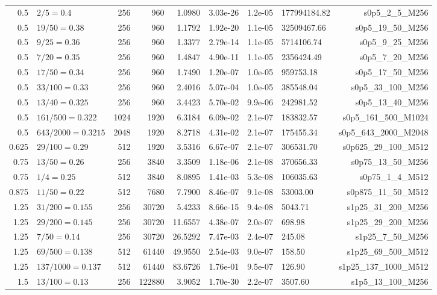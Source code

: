 \begin{center}
\begin{longtable}{@{}rlrrrlllr@{}}
0.5 & $2/5=0.4$ & 256 & 960 & 1.0980 & 3.03e-26 & 1.2e-05 & 177994184.82 & s0p5\_2\_5\_M256\\
0.5 & $19/50=0.38$ & 256 & 960 & 1.1792 & 1.92e-20 & 1.1e-05 & 32509467.66 & s0p5\_19\_50\_M256\\
0.5 & $9/25=0.36$ & 256 & 960 & 1.3377 & 2.79e-14 & 1.1e-05 & 5714106.74 & s0p5\_9\_25\_M256\\
0.5 & $7/20=0.35$ & 256 & 960 & 1.4847 & 4.90e-11 & 1.1e-05 & 2356424.49 & s0p5\_7\_20\_M256\\
0.5 & $17/50=0.34$ & 256 & 960 & 1.7490 & 1.20e-07 & 1.0e-05 & 959753.18 & s0p5\_17\_50\_M256\\
0.5 & $33/100=0.33$ & 256 & 960 & 2.4016 & 5.07e-04 & 1.0e-05 & 385548.04 & s0p5\_33\_100\_M256\\
0.5 & $13/40=0.325$ & 256 & 960 & 3.4423 & 5.70e-02 & 9.9e-06 & 242981.52 & s0p5\_13\_40\_M256\\
0.5 & $161/500=0.322$ & 1024 & 1920 & 6.3184 & 6.09e-02 & 2.1e-07 & 183832.57 & s0p5\_161\_500\_M1024\\
0.5 & $643/2000=0.3215$ & 2048 & 1920 & 8.2718 & 4.31e-02 & 2.1e-07 & 175455.34 & s0p5\_643\_2000\_M2048\\
0.625 & $29/100=0.29$ & 512 & 1920 & 3.5316 & 6.67e-07 & 2.1e-07 & 306531.70 & s0p625\_29\_100\_M512\\
0.75 & $13/50=0.26$ & 256 & 3840 & 3.3509 & 1.18e-06 & 2.1e-08 & 370656.33 & s0p75\_13\_50\_M256\\
0.75 & $1/4=0.25$ & 512 & 3840 & 8.0895 & 1.41e-03 & 5.3e-08 & 106035.63 & s0p75\_1\_4\_M512\\
0.875 & $11/50=0.22$ & 512 & 7680 & 7.7900 & 8.46e-07 & 9.1e-08 & 53003.00 & s0p875\_11\_50\_M512\\
1.25 & $31/200=0.155$ & 256 & 30720 & 5.4233 & 8.66e-15 & 9.4e-08 & 5043.71 & s1p25\_31\_200\_M256\\
1.25 & $29/200=0.145$ & 256 & 30720 & 11.6557 & 4.38e-07 & 2.0e-07 & 698.98 & s1p25\_29\_200\_M256\\
1.25 & $7/50=0.14$ & 256 & 30720 & 26.5292 & 7.47e-03 & 2.4e-07 & 245.08 & s1p25\_7\_50\_M256\\
1.25 & $69/500=0.138$ & 512 & 61440 & 49.9550 & 2.54e-03 & 9.0e-07 & 158.50 & s1p25\_69\_500\_M512\\
1.25 & $137/1000=0.137$ & 512 & 61440 & 83.6726 & 1.76e-01 & 9.5e-07 & 126.90 & s1p25\_137\_1000\_M512\\
1.5 & $13/100=0.13$ & 256 & 122880 & 3.9052 & 1.70e-30 & 2.2e-07 & 3507.60 & s1p5\_13\_100\_M256\\

\end{longtable}
\end{center}
